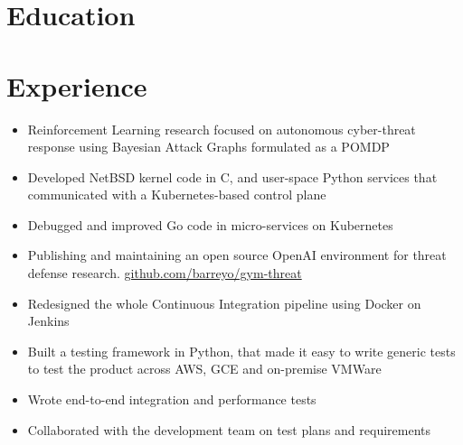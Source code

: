 \documentclass{cv_doc}
\begin{document}
\vspace{0.8cm}

\section*{Education}


\vspace{0.3cm}

\section*{Experience}


\begin{itemize}[label={\tiny\raisebox{1ex}{\textbullet}}]
  \item {Reinforcement Learning research focused on autonomous cyber-threat response using Bayesian Attack Graphs formulated as a POMDP}
  \item {Developed NetBSD kernel code in C, and user-space Python services that
  communicated with a Kubernetes-based control plane}
  \item {Debugged and improved Go code in micro-services on Kubernetes}
  \item {Publishing and maintaining an open source OpenAI environment for
  threat defense research. \href{https://github.com/barreyo/gym-threat}{github.com/barreyo/gym-threat}}
\end{itemize}


\begin{itemize}[label={\tiny\raisebox{1ex}{\textbullet}}]
  \item {Redesigned the whole Continuous Integration pipeline using Docker on
  Jenkins}
  \item {Built a testing framework in Python, that made it easy to write
  generic tests to test the product across AWS, GCE and on-premise VMWare}
  \item {Wrote end-to-end integration and performance tests}
  \item {Collaborated with the development team on test plans and requirements}
\end{itemize}
\end{document}
